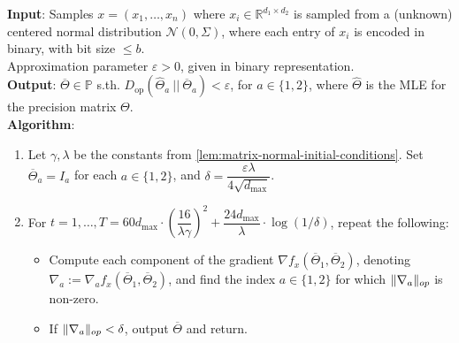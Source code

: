 \documentclass[aos]{imsart}
\theoremstyle{definition}
\numberwithin{equation}{section}
\DeclareMathOperator{\op}{op}
\DeclarePairedDelimiter{\norm}{\lVert}{\rVert}
\newcommand{\R}{{\mathbb{R}}}
\newcommand{\otheta}{\overline{\Theta}}
\newcommand{\htheta}{\widehat{\Theta}}
\newcommand{\eps}{\varepsilon}
\newcommand{\cN}{\mathcal{N}}
\newcommand{\SPD}{\mathbb{P}}
\newcommand{\samp}{x}
\def\dmax{d_{\max}}
\begin{document}

 

\begin{Algorithm}
\textbf{Input}: Samples $\samp = (\samp_1, \ldots, \samp_n)$ where $\samp_i \in \R^{d_1 \times d_2}$ is sampled from a (unknown) centered normal distribution $\cN(0, \Sigma)$, where each entry of $\samp_i$ is encoded in binary, with bit size $\le b$. \\ 
Approximation parameter $\eps > 0$, given in binary representation. \\[.3ex]

\textbf{Output}: $\otheta \in \SPD$ s.th. $D_{\op}(\htheta_a \ || \  \otheta_a) < \eps$, for $a \in \{1,2\}$, where $\htheta$ is the MLE for the precision matrix $\Theta$. \\[.3ex]

\textbf{Algorithm}:
\begin{enumerate}
\item\label{it:flip-flop step 1 matrix} Let $\gamma, \lambda$ be the constants from \cref{lem:matrix-normal-initial-conditions}. Set $\otheta_a = I_a$ for each $a \in \{1,2\}$, and $\delta = \dfrac{\eps \lambda}{4 \sqrt{\dmax}}$.

\vspace{5pt}

\item\label{it:flip-flop step 2 matrix} For $t=1,\dots,T = 60 \dmax \cdot \left( \dfrac{16}{\lambda \gamma} \right)^2 + \dfrac{24 \dmax}{\lambda} \cdot \log(1/\delta)$, repeat the following:

\vspace{5pt}

\begin{itemize}
\item Compute each component of the gradient $\nabla f_{\samp}(\otheta_1, \otheta_2)$, denoting $\nabla_a := \nabla_a f_{\samp}(\otheta_1, \otheta_2)$, and find the index $a \in \{1,2\}$ for which $\norm{\nabla_a}_{op}$ is non-zero.

\vspace{5pt}

\item
If $\norm{\nabla_a}_{op} < \delta$, output $\otheta$ and return.


\end{itemize}
\end{enumerate}
\end{Algorithm}
\end{document}
